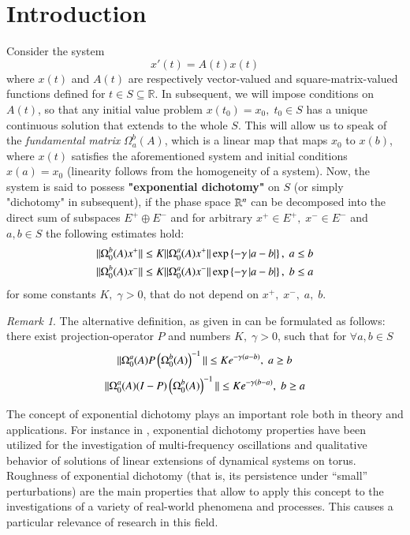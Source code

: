\documentclass{elsarticle}
\theoremstyle{remark}
\newtheorem{remark}{Remark}
\begin{document}
\section{Introduction}
Consider the system 
\[x'(t)=A(t)x(t)\]
where $x(t)$ and $A(t)$ are respectively vector-valued and square-matrix-valued functions defined for $t\in S\subseteq\mathbb{R}$.
In subsequent, we will impose conditions on $A(t)$, so that any initial value problem $x(t_0)=x_0,\;t_0\in S$ has a unique
continuous solution
that extends to the whole $S$. This will allow us to speak of the \textit{fundamental matrix} $\Omega_a^b(A)$, which is a linear map
that maps $x_0$ to $x(b)$, where $x(t)$ satisfies the aforementioned system and initial conditions
$x(a)=x_0$ (linearity follows from the homogeneity of
a system).
Now, the system is
 said to possess \textbf{"exponential dichotomy"} on $S$ (or simply "dichotomy" in subsequent), if the phase space $\mathbb{R}^n$
can be decomposed into the direct sum of subspaces
$E^+\oplus E^-$ and for arbitrary $x^+\in E^+,\; x^-\in E^-$ and $a,b\in S$ the following estimates hold:
\begin{equation}\begin{aligned}\label{DichotomyDef}
	\|\Omega^b_0(A)x^+\|\leq K\|\Omega_0^a(A)x^+\|\exp\left\{-\gamma\left|a-b\right|\right\},\;a\leq b\\
	\|\Omega^b_0(A)x^-\|\leq K\|\Omega_0^a(A)x^-\|\exp\left\{-\gamma\left|a-b\right|\right\},\;b\leq a\\
\end{aligned}\end{equation}
for some constants $K,\;\gamma>0$, that do not depend on $x^+,\;x^-,\;a,\;b$.

\begin{remark}The alternative definition, as given in \cite{coppel1978dichotomies} can be formulated as follows: there exist projection-operator $P$ and numbers
$K,\;\gamma>0$, such that
 for $\forall a,b\in S$
\[\|\Omega_0^a(A)P\left(\Omega_0^b(A)\right)^{-1}\|\leq K e^{-\gamma(a-b)},\;a\geq b\]
\[\|\Omega_0^a(A)(I-P)\left(\Omega_0^b(A)\right)^{-1}\|\leq K e^{-\gamma(b-a)},\;b\geq a\]
\end{remark}

The concept of exponential dichotomy plays an important role both in theory and applications. For instance
 in \cite{mitropolsky2002dichotomies},
 exponential dichotomy properties have been utilized
 for the investigation of multi-frequency oscillations and qualitative behavior of solutions of linear extensions of dynamical
 systems on torus. Roughness of exponential dichotomy (that is, its persistence under ``small'' perturbations) are the main
 properties that allow to apply this concept to the investigations of
 a variety of real-world phenomena and processes. This causes a particular relevance of research in this field. 
\end{document}
